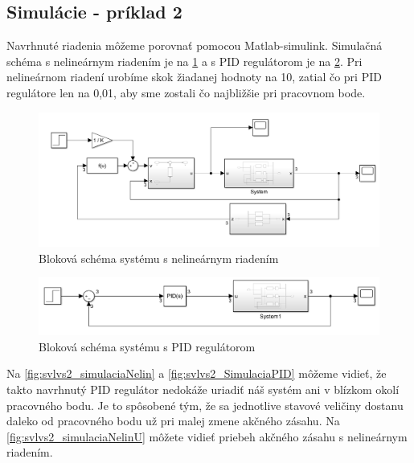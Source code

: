 \documentclass[../main.tex]{subfiles}
\begin{document}
\newpage
\subsection*{Simulácie - príklad 2}

Navrhnuté riadenia môžeme porovnať pomocou Matlab-simulink. Simulačná schéma s nelineárnym riadením je na \cref{fig:svlvs2_modelRiadenia} a s PID regulátorom je na \cref{fig:svlvs2_modelRiadeniaPID}. Pri nelineárnom riadení urobíme skok žiadanej hodnoty na 10, zatial čo pri PID regulátore len na 0,01, aby sme zostali čo najbližšie pri pracovnom bode.

	\begin{figure}[h!]
		\centering
		\includegraphics[width=0.8\linewidth]{ModelRiadenia}
		\caption{Bloková schéma systému s nelineárnym riadením}
		\label{fig:svlvs2_modelRiadenia}
	\end{figure}


	\begin{figure}[h!]
		\centering
		\includegraphics[width=0.8\linewidth]{ModelRiadeniaPID}
		\caption{Bloková schéma systému s PID regulátorom}
		\label{fig:svlvs2_modelRiadeniaPID}
	\end{figure}

Na \cref{fig:svlvs2_simulaciaNelin} a \cref{fig:svlvs2_SimulaciaPID} môžeme vidieť, že takto navrhnutý PID regulátor nedokáže uriadiť náš systém ani v blízkom okolí pracovného bodu. Je to spôsobené tým, že sa jednotlive stavové veličiny dostanu daleko od pracovného bodu už pri malej zmene akčného zásahu. Na \cref{fig:svlvs2_simulaciaNelinU} môžete vidieť priebeh akčného zásahu s nelineárnym riadením.
\end{document}

